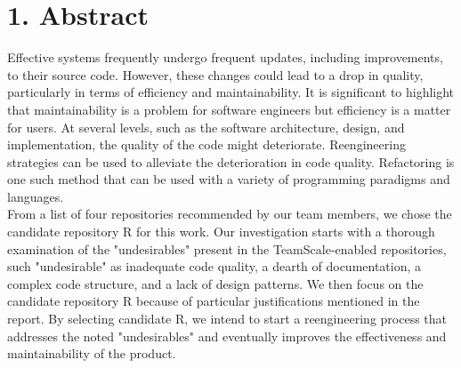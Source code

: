 \documentclass[12pt,letterpaper]{report}
\begin{document}
\section*{1. Abstract}
\normalsize { Effective systems frequently undergo frequent updates, including improvements, to their source code. However, these changes could lead to a drop in quality, particularly in terms of efficiency and maintainability. It is significant to highlight that maintainability is a problem for software engineers but efficiency is a matter for users. At several levels, such as the software architecture, design, and implementation, the quality of the code might deteriorate. Reengineering strategies can be used to alleviate the deterioration in code quality. Refactoring is one such method that can be used with a variety of programming paradigms and languages.\\

From a list of four repositories recommended by our team members, we chose the candidate repository R for this work. Our investigation starts with a thorough examination of the "undesirables" present in the TeamScale-enabled repositories, such "undesirable" as inadequate code quality, a dearth of documentation, a complex code structure, and a lack of design patterns. We then focus on the candidate repository R because of particular justifications mentioned in the report. By selecting candidate R, we intend to start a reengineering process that addresses the noted "undesirables" and eventually improves the effectiveness and maintainability of the product.
}

\end{document}
